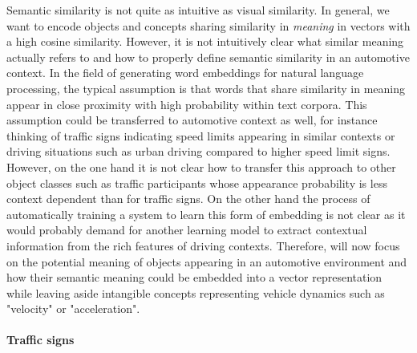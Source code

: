 Semantic similarity is not quite as intuitive as visual similarity. 
In general, we want to encode objects and concepts sharing similarity in \emph{meaning} in vectors with a high cosine similarity.
However, it is not intuitively clear what similar meaning actually refers to and how to properly define semantic similarity in an automotive context.
In the field of generating word embeddings for natural language processing, the typical assumption is that words that share similarity in meaning appear in close proximity with high probability within text corpora.
This assumption could be transferred to automotive context as well, for instance thinking of traffic signs indicating speed limits appearing in similar contexts or driving situations such as urban driving compared to higher speed limit signs.
However, on the one hand it is not clear how to transfer this approach to other object classes such as traffic participants whose appearance probability is less context dependent than for traffic signs. 
On the other hand the process of automatically training a system to learn this form of embedding is not clear as it would probably demand for another learning model to extract contextual information from the rich features of driving contexts.
Therefore, will now focus on the potential meaning of objects appearing in an automotive environment and how their semantic meaning could be embedded into a vector representation while leaving aside intangible concepts representing vehicle dynamics such as "velocity" or "acceleration".

\paragraph{Traffic signs}%
\label{par:traffic_signs}

